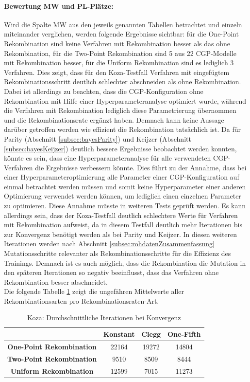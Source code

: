 \paragraph{Bewertung MW und PL-Plätze:}
Wird die Spalte MW aus den jeweils genannten Tabellen betrachtet und einzeln miteinander verglichen, werden folgende Ergebnisse sichtbar: für die One-Point Rekombination sind keine Verfahren mit Rekombination besser als das ohne Rekombination, für die Two-Point Rekombination sind 5 aus 22 CGP-Modelle mit Rekombination besser, für die Uniform Rekombination sind es lediglich 3 Verfahren.
Dies zeigt, dass für den Koza-Testfall Verfahren mit eingefügtem Rekombinationsschritt deutlich schlechter abschneiden als ohne Rekombination.
Dabei ist allerdings zu beachten, dass die CGP-Konfiguration ohne Rekombination mit Hilfe einer Hyperparameteranalyse optimiert wurde, während die Verfahren mit Rekombination lediglich diese Parametrierung übernommen und die Rekombinationsrate ergänzt haben.
Demnach kann keine Aussage darüber getroffen werden wie effizient die Rekombination tatsächlich ist.
Da für Parity (Abschnitt \ref{subsec:bayesParity}) und Keijzer (Abschnitt \ref{subsec:bayesKeijzer}) deutlich bessere Ergebnisse beobachtet werden konnten, könnte es sein, dass eine Hyperparameteranalyse für alle verwendeten CGP-Verfahren die Ergebnisse verbessern könnte.
Dies führt zu der Annahme, dass bei einer Hyperparameteroptimierung alle Parameter einer CGP-Konfiguration auf einmal betrachtet werden müssen und somit keine Hyperparameter einer anderen Optimierung verwendet werden können, um lediglich einen einzelnen Parameter zu optimieren.
Diese Annahme müsste in weiteren Tests geprüft werden.
Es kann allerdings sein, dass der Koza-Testfall deutlich schlechtere Werte für Verfahren mit Rekombination aufweist, da in diesem Testfall deutlich mehr Iterationen bis zur Konvergenz benötigt werden als bei Parity und Keijzer.
In diesen weiteren Iterationen werden nach Abschnitt \ref{subsec:rohdatenZusammenfassung} Mutationsschritte relevanter als Rekombinationsschritte für die Effizienz des Trainings.
Demnach ist es auch möglich, dass die Rekombination die Mutation in den späteren Iterationen so negativ beeinflusst, dass das Verfahren ohne Rekombination besser abschneidet.\\
Die folgende Tabelle \ref{table:kozaMW} zeigt die ungefähren Mittelwerte aller Rekombinationsarten pro Rekombinationsraten-Art. 

\begin{table}[H]
	\centering
	\begin{tabular} {c | c | c | c}
		& \textbf{Konstant} & \textbf{Clegg} & \textbf{One-Fifth} \\
		\hline
		\textbf{One-Point Rekombination} & 22164 & 19272 & 14804\\
		\hline
		\textbf{Two-Point Rekombination} & 9510 & 8509 & 8444 \\
		\hline
		\textbf{Uniform Rekombination} & 12599 & 7015 & 11273 \\
	\end{tabular}
	\caption{Koza: Durchschnittliche Iterationen bei Konvergenz}
	\label{table:kozaMW}
\end{table}

